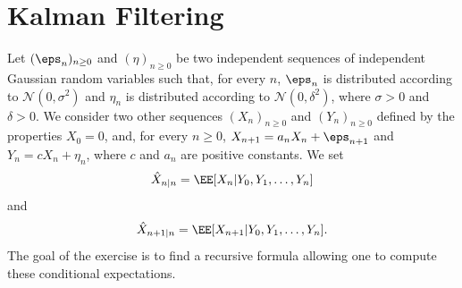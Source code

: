 \documentclass{scrartcl}
\begin{document}



\section{Kalman Filtering}

\begin{prob*}
    Let $(\eps_n)_{n \geq 0}$ and $(\eta)_{n \geq 0}$ be two independent sequences of independent Gaussian random variables such that, for every $n$, $\eps_n$ is distributed according to $\mathcal{N}(0, \sigma^2)$ and $\eta_n$ is distributed according to $\mathcal{N}(0, \delta^2)$, where $\sigma > 0$ and $\delta > 0$. We consider two other sequences $(X_n)_{n \geq 0}$ and $(Y_n)_{n \geq 0}$ defined by the properties $X_0 = 0$, and, for every $n \geq 0$, $X_{n+1} = a_nX_n + \eps_{n+1}$ and $Y_n = cX_n + \eta_n$, where $c$ and $a_n$ are positive constants. We set
    \[\hat{X}_{n|n} = \EE[X_n|Y_0, Y_1, \ldots, Y_n]\]
    and
    \[\hat{X}_{n+1|n} = \EE[X_{n+1}|Y_0, Y_1, \ldots, Y_n].\]
    The goal of the exercise is to find a recursive formula allowing one to compute these conditional expectations.
\end{prob*}
\end{document}
